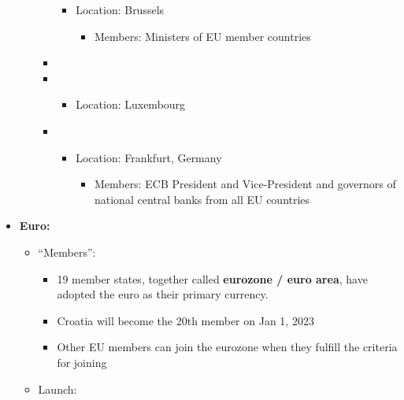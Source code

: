 \documentclass[
  12pt,
  ignorenonframetext,
  progressbar=frametitle]{beamer}
\providecommand{\tightlist}{%
  \setlength{\itemsep}{0pt}\setlength{\parskip}{0pt}}
\begin{document}
\begin{frame}[allowframebreaks]
\begin{itemize}
\begin{itemize}
\begin{itemize}
      \begin{itemize}
      \tightlist
      \item
        Location: Brussels

        \begin{itemize}
        \tightlist
        \item
          Members: Ministers of EU member countries
        \end{itemize}
      \end{itemize}
    \item
    \item

      \begin{itemize}
      \tightlist
      \item
        Location: Luxembourg
      \end{itemize}
    \item

      \begin{itemize}
      \tightlist
      \item
        Location: Frankfurt, Germany

        \begin{itemize}
        \tightlist
        \item
          Members: ECB President and Vice-President and governors of
          national central banks from all EU countries
        \end{itemize}
      \end{itemize}
    \end{itemize}
  \end{itemize}
\item
  \textbf{Euro:}

  \begin{itemize}
  \tightlist
  \item
    ``Members'':

    \begin{itemize}
    \tightlist
    \item
      19 member states, together called \textbf{eurozone / euro area},
      have adopted the euro as their primary currency.
    \item
      Croatia will become the 20th member on Jan 1, 2023
    \item
      Other EU members can join the eurozone when they fulfill the
      criteria for joining
    \end{itemize}
  \item
    Launch:


\end{itemize}
\end{itemize}
\end{frame}
\end{document}
